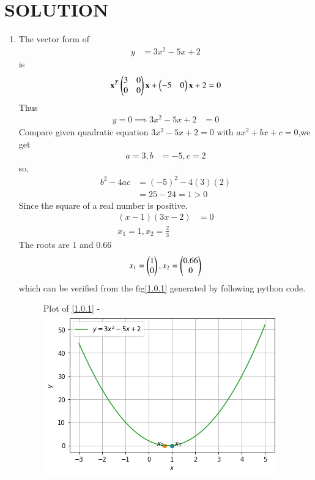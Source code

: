 \documentclass[journal,12pt,twocolumn]{IEEEtran}
\begin{document}
\section{SOLUTION}  
\begin{enumerate}
\item
The vector form of
\begin{align}
y&=3x^2-5x+2
\end{align}
is
\begin{align}
\mathbf{x}^T \begin{pmatrix}3 & 0\\0 & 0\end{pmatrix}\mathbf{x}+ \begin{pmatrix}-5 & 0\end{pmatrix}\mathbf{x}+2=0
\end{align}
Thus
\begin{align}
y=0\implies3x^2-5x+2 &=0
\end{align}
%
Compare given quadratic equation  $3x ^2 -5x +2 = 0$ with $ax^2 + bx + c = 0$,we get
\begin{align}
a=3,b&=-5,c=2
\end{align}
so,
\begin{align}
b^2-4ac&=(-5)^2-4(3)(2)\\
&=25-24=1>0
\end{align}
Since the square of a real number is positive. 
\begin{align}
 (x-1)(3x-2) &=0 \\
 x_1=1, x_2=\frac{2}{3}
\end{align}
The roots are 1 and 0.66
\begin{align}
 x_1=\begin{pmatrix}1\\0\end{pmatrix},x_2=\begin{pmatrix}0.66\\0\end{pmatrix} 
\end{align}
%
which can be verified from the fig\eqref{1.0.1} generated by following python code.
%
\begin{figure}[ht!]
Plot of \eqref{1.0.1} -
    \centering
    \includegraphics[width=\columnwidth]{figure5(1).png}

\end{figure}
\end{enumerate}
\end{document}
